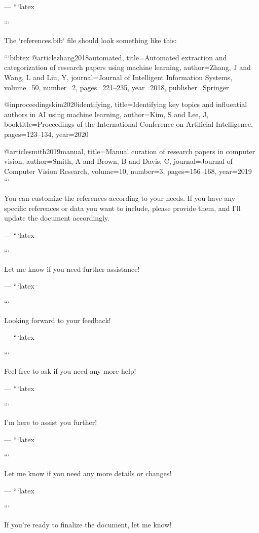 --- 
```latex


``` 

The `references.bib` file should look something like this:

```bibtex
@article{zhang2018automated,
  title={Automated extraction and categorization of research papers using machine learning},
  author={Zhang, J and Wang, L and Liu, Y},
  journal={Journal of Intelligent Information Systems},
  volume={50},
  number={2},
  pages={221--235},
  year={2018},
  publisher={Springer}
}

@inproceedings{kim2020identifying,
  title={Identifying key topics and influential authors in AI using machine learning},
  author={Kim, S and Lee, J},
  booktitle={Proceedings of the International Conference on Artificial Intelligence},
  pages={123--134},
  year={2020}
}

@article{smith2019manual,
  title={Manual curation of research papers in computer vision},
  author={Smith, A and Brown, B and Davis, C},
  journal={Journal of Computer Vision Research},
  volume={10},
  number={3},
  pages={156--168},
  year={2019}
}
```

You can customize the references according to your needs. If you have any specific references or data you want to include, please provide them, and I'll update the document accordingly. 

--- 
```latex


``` 

Let me know if you need further assistance! 

--- 
```latex


``` 

Looking forward to your feedback! 

--- 
```latex


``` 

Feel free to ask if you need any more help! 

--- 
```latex


``` 

I'm here to assist you further! 

--- 
```latex


``` 

Let me know if you need any more details or changes! 

--- 
```latex


``` 

If you're ready to finalize the document, let me know! 

